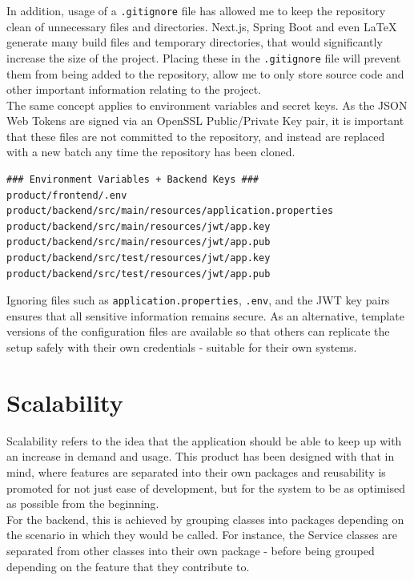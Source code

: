 \documentclass[]{final_report}
\begin{document}
In addition, usage of a \verb|.gitignore| file has allowed me to keep the repository clean of unnecessary files and directories. Next.js, Spring Boot and even \LaTeX{} generate many build files and temporary directories, that would significantly increase the size of the project. Placing these in the \verb|.gitignore| file will prevent them from being added to the repository, allow me to only store source code and other important information relating to the project.\\


The same concept applies to environment variables and secret keys. As the JSON Web Tokens are signed via an OpenSSL Public/Private Key pair, it is important that these files are not committed to the repository, and instead are replaced with a new batch any time the repository has been cloned. 

\begin{lstlisting}[caption={An excerpt from the .gitignore file, excluding environment variables and JWT keys.}]
### Environment Variables + Backend Keys ###
product/frontend/.env
product/backend/src/main/resources/application.properties
product/backend/src/main/resources/jwt/app.key
product/backend/src/main/resources/jwt/app.pub
product/backend/src/test/resources/jwt/app.key
product/backend/src/test/resources/jwt/app.pub
\end{lstlisting}

Ignoring files such as \verb|application.properties|, \verb|.env|, and the JWT key pairs ensures that all sensitive information remains secure. As an alternative, template versions of the configuration files are available so that others can replicate the setup safely with their own credentials - suitable for their own systems.

\section{Scalability}

Scalability refers to the idea that the application should be able to keep up with an increase in demand and usage. This product has been designed with that in mind, where features are separated into their own packages and reusability is promoted for not just ease of development, but for the system to be as optimised as possible from the beginning.\\

For the backend, this is achieved by grouping classes into packages depending on the scenario in which they would be called. For instance, the Service classes are separated from other classes into their own package - before being grouped depending on the feature that they contribute to.
\end{document}
